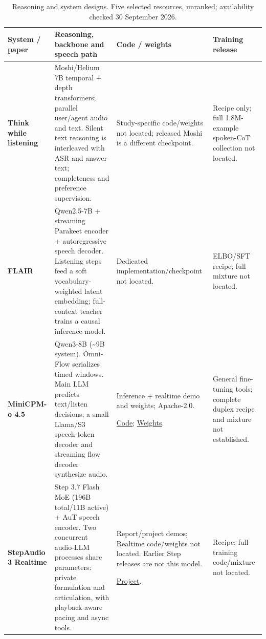 \begin{table}[H]
\centering
\small
\setlength{\tabcolsep}{4pt}
\setlength{\tablewidth}{\dimexpr\linewidth-6\tabcolsep\relax}
\renewcommand{\arraystretch}{1.12}
\caption{Reasoning and system designs. Five selected resources, unranked; availability checked 30 September 2026.}
\label{tab:systems}
\begin{tabular}{@{}>{\raggedright\arraybackslash}p{0.22\tablewidth}>{\raggedright\arraybackslash}p{0.43\tablewidth}>{\raggedright\arraybackslash}p{0.20\tablewidth}>{\raggedright\arraybackslash}p{0.15\tablewidth}@{}}
\toprule
\textbf{System / paper} & \textbf{Reasoning, backbone and speech path} & \textbf{Code / weights} & \textbf{Training release} \\
\midrule
\textbf{Think while listening}\par\citep{thinklisten} & Moshi/Helium 7B temporal + depth transformers; parallel user/agent audio and text. Silent text reasoning is interleaved with ASR and answer text; completeness and preference supervision. & Study-specific code/weights not located; released Moshi is a different checkpoint. & Recipe only; full 1.8M-example spoken-CoT collection not located. \\
\addlinespace[4pt]
\textbf{FLAIR}\par\citep{flair} & Qwen2.5-7B + streaming Parakeet encoder + autoregressive speech decoder. Listening steps feed a soft vocabulary-weighted latent embedding; full-context teacher trains a causal inference model. & Dedicated implementation/checkpoint not located. & ELBO/SFT recipe; full mixture not located. \\
\addlinespace[4pt]
\textbf{MiniCPM-o 4.5}\par\citep{minicpm} & Qwen3-8B (\textasciitilde{}9B system). Omni-Flow serializes timed windows. Main LLM predicts text/listen decisions; a small Llama/S3 speech-token decoder and streaming flow decoder synthesize audio. & Inference + realtime demo and weights; Apache-2.0.\par \href{https://github.com/OpenBMB/MiniCPM-V}{Code}; \href{https://huggingface.co/openbmb/MiniCPM-o-4_5}{Weights}. & General fine-tuning tools; complete duplex recipe and mixture not established. \\
\addlinespace[4pt]
\textbf{StepAudio 3 Realtime}\par\citep{step3} & Step 3.7 Flash MoE (196B total/11B active) + AuT speech encoder. Two concurrent audio-LLM processes share parameters: private formulation and articulation, with playback-aware pacing and async tools. & Report/project demos; Realtime code/weights not located. Earlier Step releases are not this model.\par \href{https://stepaudiollm.github.io/step-audio-3-realtime/}{Project}. & Recipe; full training code/mixture not located. \\

\end{tabular}
\end{table}
